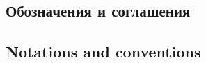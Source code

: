 \begin{Russian}
\subsection{Обозначения и соглашения}
\end{Russian}
\begin{English}
\subsection{Notations and conventions}
\end{English}
\label{sec:notation}








    
